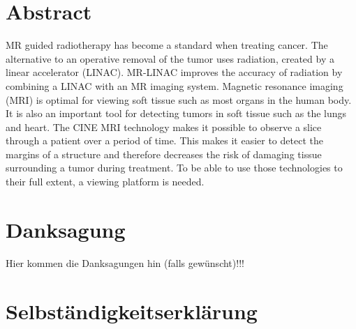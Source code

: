 \documentclass[12pt,a4paper]{report}
\begin{document}

\setcounter{page}{1}



\thispagestyle{plain}
\section*{Abstract}

MR guided radiotherapy has become a standard when treating cancer. The alternative to an operative removal of the tumor uses radiation, created by a linear accelerator (LINAC). MR-LINAC improves the accuracy of radiation by combining a LINAC with an MR imaging system. Magnetic resonance imaging (MRI) is optimal for viewing soft tissue such as most organs in the human body. It is also an important tool for detecting tumors in soft tissue such as the lungs and heart.
The CINE MRI technology makes it possible to observe a slice through a patient over a period of time.
This makes it easier to detect the margins of a structure and therefore decreases the risk of damaging tissue surrounding a tumor during treatment.
To be able to use those technologies to their full extent, a viewing platform is needed.
\newpage


\thispagestyle{plain}
\section*{Danksagung}

Hier kommen die Danksagungen hin (falls gewünscht)!!!

\newpage

\thispagestyle{empty}
\section*{Selbständigkeitserklärung}

\end{document}
